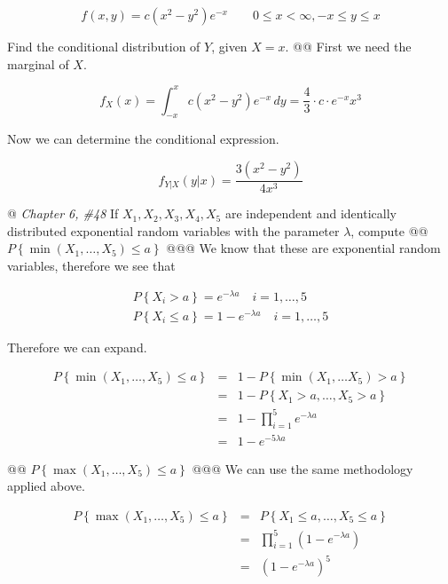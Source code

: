 \documentclass[11pt]{article}\usepackage[]{graphicx}\usepackage[]{xcolor}
\begin{document}
\begin{easylist}[enumerate]
    \[
        f(x, y) = c(x^2 - y^2)e^{-x} \qquad 0 \le x < \infty, -x \le y \le x
    \]

    Find the conditional distribution of $Y$, given $X = x$.
    @@ First we need the marginal of $X$.

    \[
        f_X(x) = \int_{-x}^x c(x^2 - y^2)e^{-x} \, dy = \frac{4}{3} \cdot c \cdot e^{-x} x^3
    \]

    Now we can determine the conditional expression.

    \[
        f_{Y|X}\left( y|x \right) = \frac{3(x^2 - y^2)}{4 x^3}
    \]

    @ \textit{Chapter 6, \#48} If $X_1, X_2, X_3, X_4, X_5$ are independent and identically distributed exponential
    random variables with the parameter $\lambda$, compute
    @@ $P\left\{ \min\left( X_1, \ldots, X_5 \right) \le a \right\}$
    @@@ We know that these are exponential random variables, therefore we see that

    \[
        \begin{aligned}
            P\left\{ X_i > a \right\} = e^{-\lambda a} \quad i = 1, \ldots, 5\\
            P\left\{ X_i \le a \right\} = 1 - e^{-\lambda a} \quad i = 1, \ldots, 5
        \end{aligned}
    \]

    Therefore we can expand.

    \[
        \begin{aligned}
            P\left\{ \min\left( X_1, \ldots, X_5 \right) \le a \right\}
                &=& 1 - P\left\{ \min\left( X_1, \ldots X_5 \right) > a \right\}\\
                &=& 1 - P\left\{ X_1 > a, \ldots, X_5 > a \right\}\\
                &=& 1 - \prod_{i = 1}^5 e^{-\lambda a}\\
                &=& 1 - e^{-5\lambda a}
        \end{aligned}
    \]

    @@ $P\left\{ \max\left( X_1, \ldots, X_5 \right) \le a \right\}$
    @@@ We can use the same methodology applied above.

    \[
        \begin{aligned}
            P\left\{ \max\left( X_1, \ldots, X_5 \right) \le a \right\}
                &=& P\left\{ X_1 \le a, \ldots, X_5 \le a \right\}\\
                &=& \prod_{i = 1}^5 \left( 1 - e^{-\lambda a} \right)\\
                &=& {\left(1 - e^{-\lambda a} \right)}^5
        \end{aligned}
    \]


\end{easylist}
\end{document}
